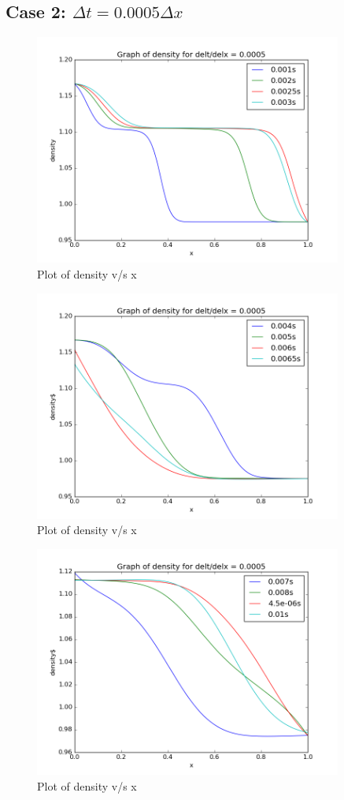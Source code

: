 \documentclass[11pt, a4paper]{article}
\begin{document}
\subsection{Case 2: $\Delta t = 0.0005 \Delta x$}
\begin{figure}[H]
 \centering
 \includegraphics[width = 0.9\textwidth]{lax_fed_2_1.png}
 \caption{Plot of density v/s x}
\end{figure}
\begin{figure}[H]
 \centering
 \includegraphics[width = 0.9\textwidth]{lax_fed_2_2.png}
 \caption{Plot of density v/s x}
\end{figure}
\begin{figure}[H]
 \centering
 \includegraphics[width = 0.9\textwidth]{lax_fed_2_3.png}
 \caption{Plot of density v/s x}
\end{figure}
\end{document}
